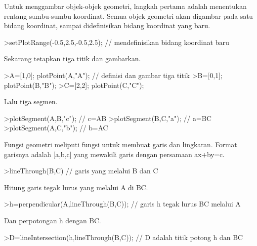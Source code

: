 \documentclass[a4paper,10pt]{article}
\begin{document}
\begin{eulernotebook}
\begin{eulercomment}
\begin{eulercomment}
\begin{eulercomment}
\end{eulercomment}
\begin{eulercomment}
Untuk menggambar objek-objek geometri, langkah pertama adalah
menentukan rentang sumbu-sumbu koordinat. Semua objek geometri akan
digambar pada satu bidang koordinat, sampai didefinisikan bidang
koordinat yang baru.
\end{eulercomment}
\begin{eulerprompt}
>setPlotRange(-0.5,2.5,-0.5,2.5); // mendefinisikan bidang koordinat baru 
\end{eulerprompt}
\begin{eulercomment}
Sekarang tetapkan tiga titik dan gambarkan.
\end{eulercomment}
\begin{eulerprompt}
>A=[1,0]; plotPoint(A,"A"); // definisi dan gambar tiga titik
>B=[0,1]; plotPoint(B,"B");
>C=[2,2]; plotPoint(C,"C");
\end{eulerprompt}
\begin{eulercomment}
Lalu tiga segmen.
\end{eulercomment}
\begin{eulerprompt}
>plotSegment(A,B,"c"); // c=AB
>plotSegment(B,C,"a"); // a=BC
>plotSegment(A,C,"b"); // b=AC
\end{eulerprompt}
\begin{eulercomment}
Fungsi geometri meliputi fungsi untuk membuat garis dan lingkaran.
Format garisnya adalah [a,b,c] yang mewakili garis dengan persamaan
ax+by=c.
\end{eulercomment}
\begin{eulerprompt}
>lineThrough(B,C) // garis yang melalui B dan C
\end{eulerprompt}
\begin{euleroutput}
  [-1,  2,  2]
\end{euleroutput}
\begin{eulercomment}
Hitung garis tegak lurus yang melalui A di BC.
\end{eulercomment}
\begin{eulerprompt}
>h=perpendicular(A,lineThrough(B,C)); // garis h tegak lurus BC melalui A
\end{eulerprompt}
\begin{eulercomment}
Dan perpotongan h dengan BC.
\end{eulercomment}
\begin{eulerprompt}
>D=lineIntersection(h,lineThrough(B,C)); // D adalah titik potong h dan BC

\end{eulerprompt}
\end{eulercomment}
\end{eulercomment}
\end{eulernotebook}
\end{document}

